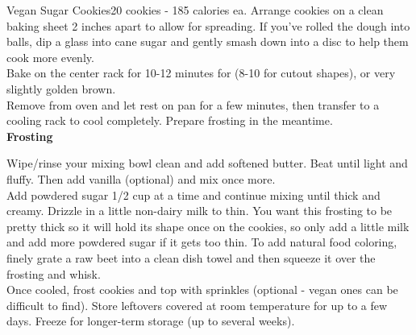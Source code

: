 \begin{recipe}{Vegan Sugar Cookies}{20 cookies - 185 calories ea.}{}
Arrange cookies on a clean baking sheet 2 inches apart to allow for spreading. If you’ve rolled the dough into balls, dip a glass into cane sugar and gently smash down into a disc to help them cook more evenly.\\

Bake on the center rack for 10-12 minutes for (8-10 for cutout shapes), or very slightly golden brown.\\

Remove from oven and let rest on pan for a few minutes, then transfer to a cooling rack to cool completely. Prepare frosting in the meantime.\\

\textbf{Frosting}

Wipe/rinse your mixing bowl clean and add softened butter. Beat until light and fluffy. Then add vanilla (optional) and mix once more.\\ 

Add powdered sugar 1/2 cup at a time and continue mixing until thick and creamy. Drizzle in a little non-dairy milk to thin. You want this frosting to be pretty thick so it will hold its shape once on the cookies, so only add a little milk and add more powdered sugar if it gets too thin.
To add natural food coloring, finely grate a raw beet into a clean dish towel and then squeeze it over the frosting and whisk.\\

Once cooled, frost cookies and top with sprinkles (optional - vegan ones can be difficult to find). Store leftovers covered at room temperature for up to a few days. Freeze for longer-term storage (up to several weeks).

\end{recipe}